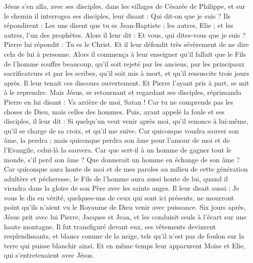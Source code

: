 \begin{multicols}{2}
Jésus s’en alla, avec ses disciples, dans les villages de Césarée de Philippe, et sur le chemin il interrogea ses disciples, leur disant : Qui dit-on que je suis ?
Ils répondirent : Les uns disent que tu es Jean-Baptiste ; les autres, Elie ; et les autres, l'un des prophètes.
Alors il leur dit : Et vous, qui dites-vous que je suis ? Pierre lui répondit : Tu es le Christ.
Et il leur défendit très sévèrement de ne dire cela de lui à personne.
Alors il commença à leur enseigner qu'il fallait que le Fils de l'homme souffre beaucoup, qu'il soit rejeté par les anciens, par les principaux sacrificateurs et par les scribes, qu'il soit mis à mort, et qu'il ressuscite trois jours après.
Il leur tenait ces discours ouvertement. Et Pierre l’ayant pris à part, se mit à le reprendre.
Mais Jésus, se retournant et regardant ses disciples, réprimanda Pierre en lui disant : Va arrière de moi, Satan ! Car tu ne comprends pas les choses de Dieu, mais celles des hommes.
Puis, ayant appelé la foule et ses disciples, il leur dit : Si quelqu’un veut venir après moi, qu'il renonce à lui-même, qu'il se charge de sa croix, et qu’il me suive.
Car quiconque voudra sauver son âme, la perdra ; mais quiconque perdra son âme pour l'amour de moi et de l'Evangile, celui-là la sauvera.
Car que sert-il à un homme de gagner tout le monde, s'il perd son âme ?
Que donnerait un homme en échange de son âme ?
Car quiconque aura honte de moi et de mes paroles au milieu de cette génération adultère et pécheresse, le Fils de l'homme aura aussi honte de lui, quand il viendra dans la gloire de son Père avec les saints anges.
\VerseOne{}Il leur disait aussi : Je vous le dis en vérité, quelques-uns de ceux qui sont ici présents, ne mourront point qu’ils n’aient vu le Royaume de Dieu venir avec puissance{}.
Six jours après, Jésus prit avec lui Pierre, Jacques et Jean, et les conduisit seuls à l'écart sur une haute montagne. Il fut transfiguré devant eux,
ses vêtements devinrent resplendissants, et blancs comme de la neige, tels qu'il n’est pas de foulon sur la terre qui puisse blanchir ainsi.
Et en même temps leur apparurent Moïse et Elie, qui s’entretenaient avec Jésus.

\end{multicols}
